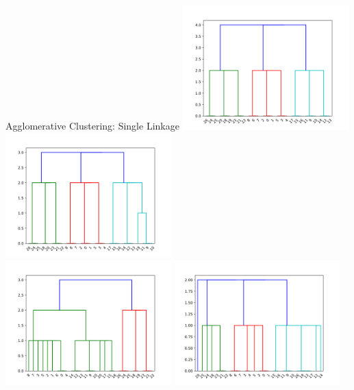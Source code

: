 \documentclass[rgb]{beamer}
\begin{document}
        
        \begin{frame}{Agglomerative Clustering: Single Linkage}
             \centering\includegraphics[keepaspectratio,width=0.48\textwidth, height=0.48\textheight]{graphics/results_single/noise_False_dendro.png} \hspace{2cm}
             \includegraphics[keepaspectratio,width=0.48\textwidth, height=0.48\textheight]{graphics/results_single/noise_10_dendro.png} \\
            \includegraphics[keepaspectratio,width=0.48\textwidth, height=0.48\textheight]{graphics/results_single/noise_33_dendro.png} \hspace{2cm}
           \includegraphics[keepaspectratio,width=0.48\textwidth, height=0.48\textheight]{graphics/results_single/noise_50_dendro.png}
        \end{frame}{}
        
\end{document}
